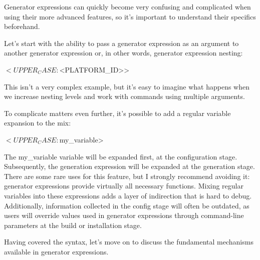 Generator expressions can quickly become very confusing and complicated when using their more advanced features, so it’s important to understand their specifics beforehand.


Let’s start with the ability to pass a generator expression as an argument to another generator expression or, in other words, generator expression nesting:

\begin{shell}
$<UPPER_CASE:$<PLATFORM_ID>>
\end{shell}

This isn’t a very complex example, but it’s easy to imagine what happens when we increase nesting levels and work with commands using multiple arguments.

To complicate matters even further, it’s possible to add a regular variable expansion to the mix:

\begin{shell}
$<UPPER_CASE:${my_variable}>
\end{shell}

The my\_variable variable will be expanded first, at the configuration stage. Subsequently, the generation expression will be expanded at the generation stage. There are some rare uses for this feature, but I strongly recommend avoiding it: generator expressions provide virtually all necessary functions. Mixing regular variables into these expressions adds a layer of indirection that is hard to debug. Additionally, information collected in the config stage will often be outdated, as users will override values used in generator expressions through command-line parameters at the build or installation stage.

Having covered the syntax, let’s move on to discuss the fundamental mechanisms available in generator expressions.













